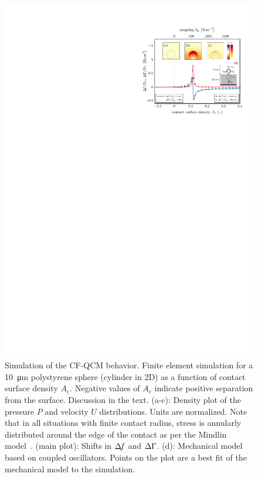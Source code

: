 \begin{figure}[ht]
\centering
\includegraphics{qcm/figures/figure3.pdf}
\caption{%
Simulation of the CF-QCM behavior.
Finite element simulation for a \SI{10}{\micro\meter} polystyrene
sphere (cylinder in 2D) as a function of contact surface density 
$A_\mathrm{c}$.  Negative values of $A_\mathrm{c}$ indicate positive
separation from the surface.  Discussion in the text. (a-c): Density plot
of the pressure $P$ and velocity $U$ distributions. Units are normalized.
Note that in all situations with finite contact radius, 
stress is annularly distributed around the edge of the contact as per the
Mindlin model~\cite{kumacheva1998interfacial}.
(main plot): Shifts in $\Delta\!f$ and $\Delta\Gamma$.
(d): Mechanical model based on coupled oscillators. Points on the plot are
a best fit of the mechanical model to the simulation.}
\label{fig:lowersphere}
\end{figure}

